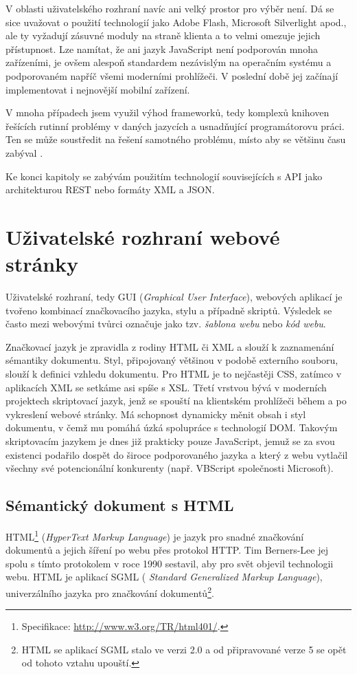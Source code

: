 V oblasti uživatelského rozhraní navíc ani velký prostor pro výběr
není. Dá se sice uvažovat o použití technologií jako Adobe Flash, Microsoft
Silverlight apod., ale ty vyžadují zásuvné moduly na straně klienta
a to velmi omezuje jejich přístupnost. Lze namítat, že ani jazyk
JavaScript není podporován mnoha zařízeními, je ovšem alespoň
standardem nezávislým na operačním systému a podporovaném napříč všemi
moderními prohlížeči. V poslední době jej začínají implementovat i
nejnovější mobilní zařízení.

V mnoha případech jsem využil výhod frameworků, tedy komplexů
knihoven řešících rutinní problémy v daných jazycích a usnadňující
programátorovu práci. Ten se může soustředit na řešení samotného
problému, místo aby se většinu času zabýval .

Ke konci kapitoly se zabývám použitím technologií souvisejících s API
jako architekturou REST nebo formáty XML a JSON.

\section{Uživatelské rozhraní webové stránky}\label{gui}
Uživatelské rozhraní, tedy GUI ({\it Graphical User Interface}),
webových aplikací je tvořeno kombinací značkovacího jazyka, stylu a
případně skriptů. Výsledek se často mezi webovými tvůrci označuje
jako tzv. {\it šablona webu} nebo {\it kód webu}.

Značkovací jazyk je zpravidla z rodiny HTML či XML a slouží k
zaznamenání sémantiky dokumentu. Styl, připojovaný většinou v podobě
externího souboru, slouží k definici vzhledu dokumentu. Pro HTML je
to nejčastěji CSS, zatímco v aplikacích XML se setkáme asi spíše s
XSL. Třetí vrstvou bývá v  moderních projektech skriptovací
jazyk, jenž se spouští na klientském prohlížeči během a po vykreslení
webové stránky. Má schopnost dynamicky měnit obsah i styl dokumentu, v
čemž mu pomáhá úzká spolupráce s technologií DOM. Takovým skriptovacím
jazykem je dnes již prakticky pouze JavaScript, jemuž se za svou
existenci podařilo dospět do široce podporovaného jazyka a který z
webu vytlačil všechny své potencionální konkurenty (např. VBScript
společnosti Microsoft).

\subsection{Sémantický dokument s HTML}
HTML\footnote{Specifikace: \url{http://www.w3.org/TR/html401/}.}
({\it HyperText Markup Language}) je jazyk pro snadné značkování dokumentů a jejich šíření po webu přes protokol HTTP. Tim
Berners-Lee jej spolu s tímto protokolem v roce 1990 sestavil, aby
pro svět objevil technologii webu. HTML je aplikací SGML ({\it
Standard Generalized Markup Language}), univerzálního jazyka pro značkování
dokumentů\footnote{HTML se aplikací SGML stalo ve verzi 2.0 a od
připravované verze 5 se opět od tohoto vztahu upouští.}.
\cite{htmlHistory}

